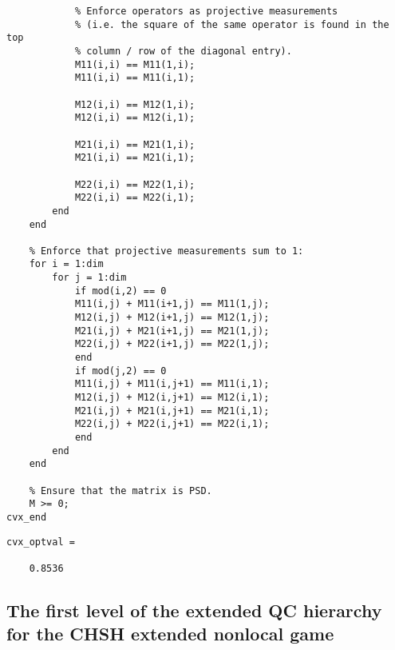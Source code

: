 \begin{verbatim}
            % Enforce operators as projective measurements
            % (i.e. the square of the same operator is found in the top
            % column / row of the diagonal entry). 
            M11(i,i) == M11(1,i);
            M11(i,i) == M11(i,1);
                        
            M12(i,i) == M12(1,i);
            M12(i,i) == M12(i,1);

            M21(i,i) == M21(1,i);
            M21(i,i) == M21(i,1);

            M22(i,i) == M22(1,i);
            M22(i,i) == M22(i,1);
        end
    end  

	% Enforce that projective measurements sum to 1:
    for i = 1:dim
    	for j = 1:dim
    		if mod(i,2) == 0    			
    		M11(i,j) + M11(i+1,j) == M11(1,j);
    		M12(i,j) + M12(i+1,j) == M12(1,j);
			M21(i,j) + M21(i+1,j) == M21(1,j);
			M22(i,j) + M22(i+1,j) == M22(1,j);
    		end
    		if mod(j,2) == 0
    		M11(i,j) + M11(i,j+1) == M11(i,1);
    		M12(i,j) + M12(i,j+1) == M12(i,1);
    		M21(i,j) + M21(i,j+1) == M21(i,1);
    		M22(i,j) + M22(i,j+1) == M22(i,1);   		    		
	    	end
    	end
    end

    % Ensure that the matrix is PSD.
    M >= 0;
cvx_end
\end{verbatim}
\color{black}
\color{lightgray} 
\begin{verbatim}     
cvx_optval =

    0.8536
\end{verbatim}
\color{black}

\subsection{The first level of the extended QC hierarchy for the CHSH extended nonlocal game} \label{code:first-level-qc-hierarchy-chsh}

